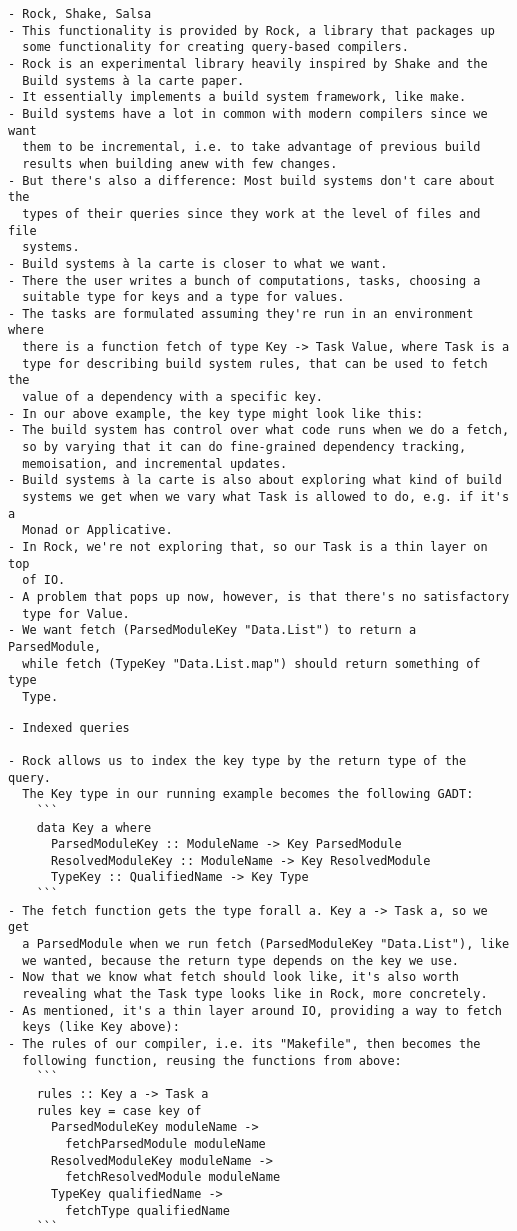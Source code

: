 \documentclass[12pt, a4paper]{report}
\begin{document}
\begin{verbatim}
- Rock, Shake, Salsa
- This functionality is provided by Rock, a library that packages up
  some functionality for creating query-based compilers.
- Rock is an experimental library heavily inspired by Shake and the
  Build systems à la carte paper.
- It essentially implements a build system framework, like make.
- Build systems have a lot in common with modern compilers since we want
  them to be incremental, i.e. to take advantage of previous build
  results when building anew with few changes.
- But there's also a difference: Most build systems don't care about the
  types of their queries since they work at the level of files and file
  systems.
- Build systems à la carte is closer to what we want.
- There the user writes a bunch of computations, tasks, choosing a
  suitable type for keys and a type for values.
- The tasks are formulated assuming they're run in an environment where
  there is a function fetch of type Key -> Task Value, where Task is a
  type for describing build system rules, that can be used to fetch the
  value of a dependency with a specific key.
- In our above example, the key type might look like this:
- The build system has control over what code runs when we do a fetch,
  so by varying that it can do fine-grained dependency tracking,
  memoisation, and incremental updates.
- Build systems à la carte is also about exploring what kind of build
  systems we get when we vary what Task is allowed to do, e.g. if it's a
  Monad or Applicative.
- In Rock, we're not exploring that, so our Task is a thin layer on top
  of IO.
- A problem that pops up now, however, is that there's no satisfactory
  type for Value.
- We want fetch (ParsedModuleKey "Data.List") to return a ParsedModule,
  while fetch (TypeKey "Data.List.map") should return something of type
  Type.
\end{verbatim}

\begin{verbatim}
- Indexed queries

- Rock allows us to index the key type by the return type of the query.
  The Key type in our running example becomes the following GADT:
	```
	data Key a where
	  ParsedModuleKey :: ModuleName -> Key ParsedModule
	  ResolvedModuleKey :: ModuleName -> Key ResolvedModule
	  TypeKey :: QualifiedName -> Key Type
	```
- The fetch function gets the type forall a. Key a -> Task a, so we get
  a ParsedModule when we run fetch (ParsedModuleKey "Data.List"), like
  we wanted, because the return type depends on the key we use.
- Now that we know what fetch should look like, it's also worth
  revealing what the Task type looks like in Rock, more concretely.
- As mentioned, it's a thin layer around IO, providing a way to fetch
  keys (like Key above):
- The rules of our compiler, i.e. its "Makefile", then becomes the
  following function, reusing the functions from above:
	```
	rules :: Key a -> Task a
	rules key = case key of
	  ParsedModuleKey moduleName ->
	    fetchParsedModule moduleName
	  ResolvedModuleKey moduleName ->
	    fetchResolvedModule moduleName
	  TypeKey qualifiedName ->
	    fetchType qualifiedName
	```
\end{verbatim}
\end{document}

